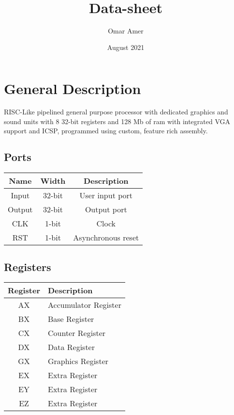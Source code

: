 \documentclass[a4paper, 11pt]{report}
\title{Data-sheet}
\author{Omar Amer}
\date{August 2021}
\begin{document}
\maketitle


\section{General Description}
RISC-Like pipelined general purpose processor with dedicated graphics and sound units with 8 32-bit registers and 128 Mb of ram with integrated VGA support and ICSP, programmed using custom, feature rich assembly.
\subsection{Ports}
\begin{center}
    \begin{tabular}{|c|c|c|}
        \hline
        Name   & Width  & Description        \\
        \hline
        Input  & 32-bit & User input port    \\
        \hline
        Output & 32-bit & Output port        \\
        \hline
        CLK    & 1-bit  & Clock              \\
        \hline
        RST    & 1-bit  & Asynchronous reset \\
        \hline
    \end{tabular}
\end{center}
\subsection{Registers}
\begin{center}
    \begin{tabular}{|c|l|}
        \hline
        Register & Description          \\
        \hline
        AX       & Accumulator Register \\
        \hline
        BX       & Base Register        \\
        \hline
        CX       & Counter Register     \\
        \hline
        DX       & Data Register        \\
        \hline
        GX       & Graphics Register    \\
        \hline
        EX       & Extra Register       \\
        \hline
        EY       & Extra Register       \\
        \hline
        EZ       & Extra Register       \\
        \hline
    \end{tabular}
\end{center}
\pagebreak
\end{document}
